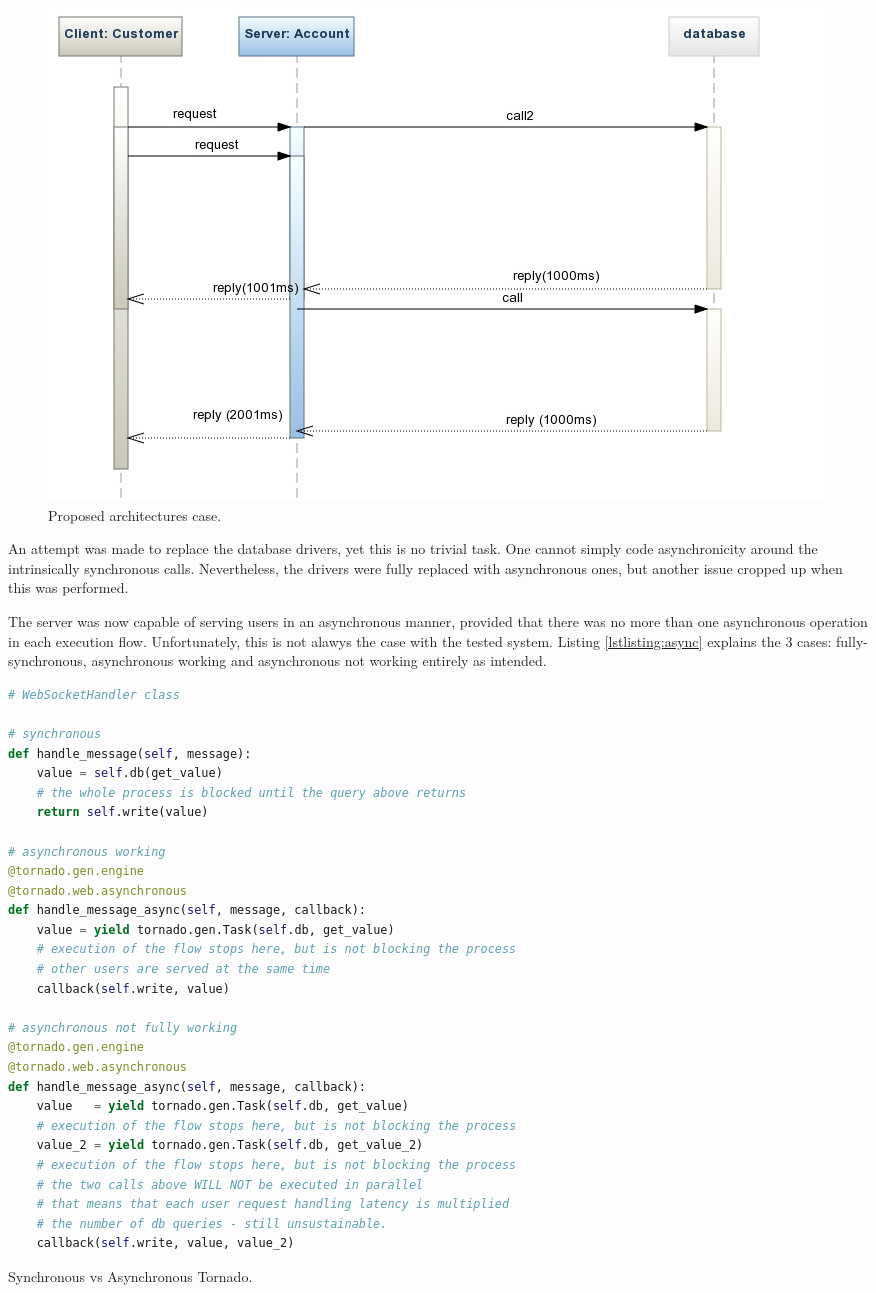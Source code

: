 \documentclass{uvamscse}
\begin{document}
\begin{figure}[H]
\centering
\includegraphics[scale=0.5]{case2}
\caption{Proposed architectures case.}
\label{figure:case2}
\end{figure}
An attempt was made to replace the database drivers, yet this is no trivial task. One cannot simply code asynchronicity around the intrinsically synchronous calls. Nevertheless, the drivers were fully replaced with asynchronous ones, but another issue cropped up when this was performed.

The server was now capable of serving users in an asynchronous manner, provided that there was no more than one asynchronous operation in each execution flow. Unfortunately, this is not alawys the case with the tested system. Listing \ref{lstlisting:async} explains the 3 cases: fully-synchronous, asynchronous working and asynchronous not working entirely as intended.

\begin{sourcecode}[H]
\begin{lstlisting}[style=mono, language=Python]
# WebSocketHandler class

# synchronous
def handle_message(self, message):
    value = self.db(get_value)
    # the whole process is blocked until the query above returns
    return self.write(value)

# asynchronous working
@tornado.gen.engine
@tornado.web.asynchronous
def handle_message_async(self, message, callback):
    value = yield tornado.gen.Task(self.db, get_value)
    # execution of the flow stops here, but is not blocking the process
    # other users are served at the same time
    callback(self.write, value)

# asynchronous not fully working
@tornado.gen.engine
@tornado.web.asynchronous
def handle_message_async(self, message, callback):
    value   = yield tornado.gen.Task(self.db, get_value)
    # execution of the flow stops here, but is not blocking the process
    value_2 = yield tornado.gen.Task(self.db, get_value_2)
    # execution of the flow stops here, but is not blocking the process
    # the two calls above WILL NOT be executed in parallel
    # that means that each user request handling latency is multiplied
    # the number of db queries - still unsustainable.
    callback(self.write, value, value_2)
\end{lstlisting}
\caption{Synchronous vs Asynchronous Tornado.}
\label{lstlisting:async}
\end{sourcecode}
\end{document}
